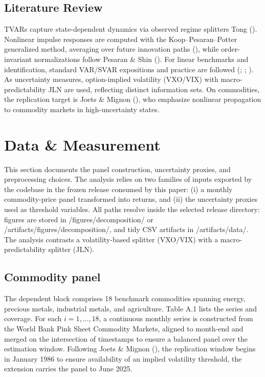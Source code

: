 \documentclass[
  11pt,
]{article}
\begin{document}
\subsection{Literature Review}\label{literature-review}

TVARs capture state-dependent dynamics via observed regime splitters Tong (). Nonlinear impulse responses are computed with the Koop--Pesaran--Potter generalized method, averaging over future innovation paths (), while order-invariant normalizations follow Pesaran \& Shin (). For linear benchmarks and identification, standard VAR/SVAR expositions and practice are followed (; ; ). As uncertainty measures, option-implied volatility (VXO/VIX) with macro-predictability JLN are used, reflecting distinct information sets. On commodities, the replication target is Joets \& Mignon (), who emphasize nonlinear propagation to commodity markets in high-uncertainty states.

\section{Data \& Measurement}\label{sec:data}

This section documents the panel construction, uncertainty proxies, and preprocessing choices. The analysis relies on two families of inputs exported by the codebase in the frozen release consumed by this paper: (i) a monthly commodity-price panel transformed into returns, and (ii) the uncertainty proxies used as threshold variables. All paths resolve inside the selected release directory: figures are stored in /figures/decomposition/ or /artifacts/figures/decomposition/, and tidy CSV artifacts in /artifacts/data/. The analysis contrasts a volatility-based splitter (VXO/VIX) with a macro-predictability splitter (JLN).

\subsection{Commodity panel}\label{sec:dataone}

The dependent block comprises 18 benchmark commodities spanning energy, precious metals, industrial metals, and agriculture. Table A.1 lists the series and coverage. For each \(i = 1,\ldots,18\), a continuous monthly series is constructed from the World Bank Pink Sheet Commodity Markets, aligned to month-end and merged on the intersection of timestamps to ensure a balanced panel over the estimation window. Following Joets \& Mignon (), the replication window begins in January 1986 to ensure availability of an implied volatility threshold, the extension carries the panel to June 2025.
\end{document}

